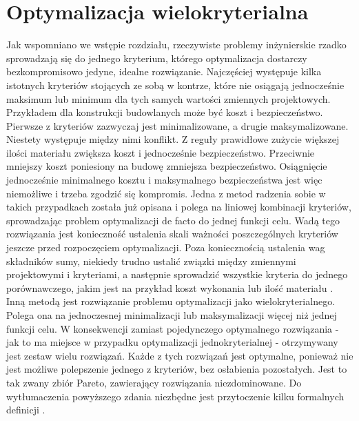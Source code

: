 \section{Optymalizacja wielokryterialna} \label{sect: multiobjective_opt}
Jak wspomniano we wstępie rozdziału, rzeczywiste problemy inżynierskie rzadko sprowadzają się do jednego kryterium, którego optymalizacja dostarczy bezkompromisowo jedyne, idealne rozwiązanie. Najczęściej występuje kilka istotnych kryteriów stojących ze sobą w kontrze, które nie osiągają jednocześnie maksimum lub minimum dla tych samych wartości zmiennych projektowych. Przykładem dla konstrukcji budowlanych może być koszt i bezpieczeństwo. Pierwsze z kryteriów zazwyczaj jest minimalizowane, a drugie maksymalizowane. Niestety występuje między nimi konflikt. Z reguły prawidłowe zużycie większej ilości materiału zwiększa koszt i jednocześnie bezpieczeństwo. Przeciwnie mniejszy koszt poniesiony na budowę zmniejsza bezpieczeństwo. Osiągnięcie jednocześnie minimalnego kosztu i maksymalnego bezpieczeństwa jest więc niemożliwe i trzeba zgodzić się kompromis. Jedna z metod radzenia sobie w takich przypadkach została już opisana i polega na liniowej kombinacji kryteriów, sprowadzając problem optymalizacji de facto do jednej funkcji celu. Wadą tego rozwiązania jest konieczność ustalenia skali ważności poszczególnych kryteriów jeszcze przed rozpoczęciem optymalizacji. Poza koniecznością ustalenia wag składników sumy, niekiedy trudno ustalić związki między zmiennymi projektowymi i kryteriami, a następnie sprowadzić wszystkie kryteria do jednego porównawczego, jakim jest na przykład koszt wykonania lub ilość materiału \parencite{Szymczak1995}. Inną metodą jest rozwiązanie problemu optymalizacji jako wielokryterialnego. Polega ona na jednoczesnej minimalizacji lub maksymalizacji więcej niż jednej funkcji celu. W konsekwencji zamiast pojedynczego optymalnego rozwiązania - jak to ma miejsce w przypadku optymalizacji jednokryterialnej - otrzymywany jest zestaw wielu rozwiązań. Każde z tych rozwiązań jest optymalne, ponieważ nie jest możliwe polepszenie jednego z kryteriów, bez osłabienia pozostałych. Jest to tak zwany zbiór Pareto, zawierający rozwiązania niezdominowane. Do wytłumaczenia powyższego zdania niezbędne jest przytoczenie kilku formalnych definicji \parencite{CoelloCoello2006}. 

